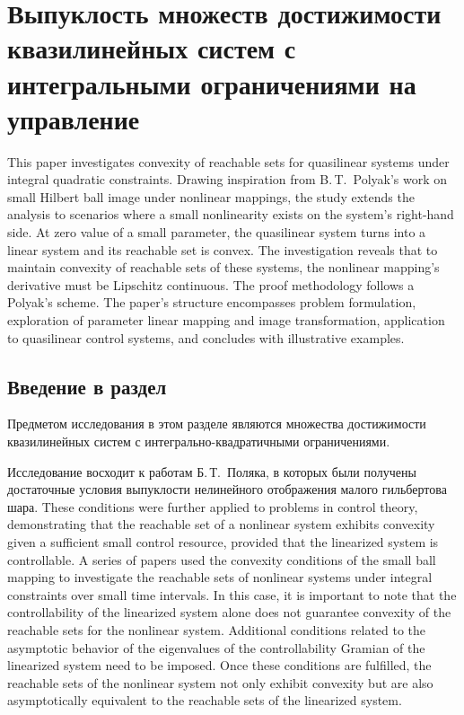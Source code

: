 \documentclass[../main.tex]{subfiles}
\begin{document}
\clearpage
\section{Выпуклость множеств достижимости квазилинейных систем с интегральными ограничениями на управление}
This paper investigates convexity of reachable sets for quasilinear systems under integral quadratic constraints. Drawing inspiration from B.\,T.~Polyak's work on small Hilbert ball image under nonlinear mappings, the study extends the analysis to scenarios where a small nonlinearity exists on the system's right-hand side. At zero value of a small parameter, the quasilinear system turns into a linear system and its reachable set is convex.  The investigation reveals that to maintain convexity of reachable sets of these systems, the nonlinear mapping's derivative must be Lipschitz continuous. The proof methodology follows a Polyak's scheme. The paper's structure encompasses problem formulation, exploration of parameter linear mapping and image transformation, application to quasilinear control systems, and concludes with illustrative examples. 

\subsection{Введение в раздел}

Предметом исследования в этом разделе являются множества достижимости квазилинейных систем с интегрально-квадратичными ограничениями.

Исследование восходит к работам Б.\,Т.~Поляка\cite{Polyak2001}, в которых были получены достаточные условия выпуклости нелинейного отображения малого гильбертова шара.
These conditions were further applied to problems in control theory, demonstrating that the reachable set of a nonlinear system exhibits convexity given a sufficient small control resource, provided that the linearized system is controllable. A series of papers \cite{GusOsSteklov, GusevUMJ, Osipov, GusOsUdmurt} used the convexity conditions of the small ball mapping to investigate the reachable sets of nonlinear systems under integral constraints over small time intervals. 
In this case, it is important to note that the controllability of the linearized system alone does not guarantee convexity of the reachable sets for the nonlinear system. Additional conditions related to the asymptotic behavior of the eigenvalues of the controllability Gramian of the linearized system need to be imposed.  Once these conditions are fulfilled, the reachable sets of the nonlinear system not only exhibit convexity but are also asymptotically equivalent to the reachable sets of the linearized system.
\end{document}
